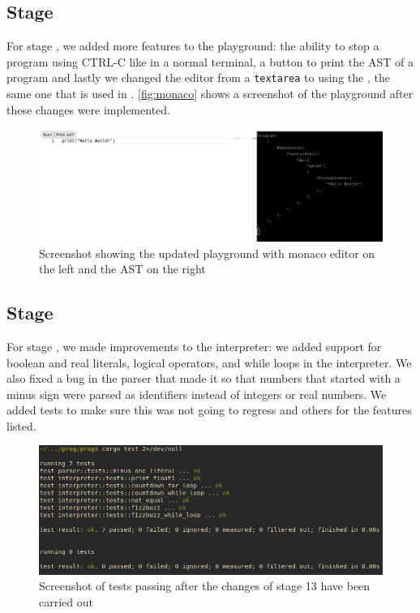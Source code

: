 \documentclass{article}
\newcommand{\subsecnum}{\the\value{subsection}}
\begin{document}
\subsection{Stage \subsecnum}

For stage \subsecnum, we added more features to the playground: the ability to
stop a program using CTRL-C like in a normal terminal, a button to print the
AST of a program and lastly we changed the editor from a \texttt{textarea} to
using the , the same one that is used in .
\autoref{fig:monaco} shows a screenshot of the playground after these changes
were implemented.

\begin{figure}
	\includegraphics[width=\textwidth]{monaco}
	\caption{Screenshot showing the updated playground with monaco editor on
	the left and the AST on the right}
	\label{fig:monaco}
\end{figure}

\subsection{Stage \subsecnum}

For stage \subsecnum, we made improvements to the interpreter: we added support
for boolean and real literals, logical operators, and while loops in the
interpreter. We also fixed a bug in the parser that made it so that numbers
that started with a minus sign were parsed as identifiers instead of integers
or real numbers. We added tests to make sure this was not going to regress and
others for the features listed.

\begin{figure}
	\includegraphics[width=\textwidth]{stage13_test}
	\caption{Screenshot of tests passing after the changes of stage 13 have
	been carried out}
	\label{fig:stage13_test}
\end{figure}
\end{document}
